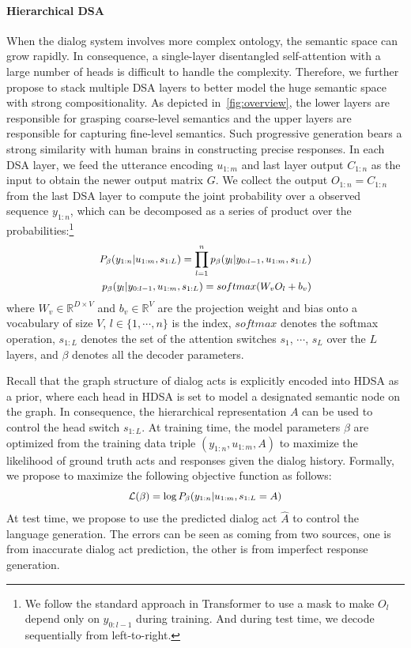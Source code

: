 \documentclass[11pt,a4paper]{article}
\begin{document}
\paragraph{Hierarchical DSA}
When the dialog system involves more complex ontology, the semantic space can grow rapidly. In consequence, a single-layer disentangled self-attention with a large number of heads is difficult to handle the complexity. Therefore, we further propose to stack multiple DSA layers to better model the huge semantic space with strong compositionality. As depicted in~\autoref{fig:overview}, the lower layers are responsible for grasping coarse-level semantics and the upper layers are responsible for capturing fine-level semantics. Such progressive generation bears a strong similarity with human brains in constructing precise responses. In each DSA layer, we feed the utterance encoding $u_{1:m}$ and last layer output $C_{1:n}$ as the input to obtain the newer output matrix $G$. We collect the output $O_{1:n}=C_{1:n}$ from the last DSA layer to compute the joint probability over a observed sequence $y_{1:n}$, which can be decomposed as a series of product over the probabilities:\footnote{We follow the standard approach in Transformer to use a mask to make $O_l$ depend only on $y_{0:l-1}$ during training. And during test time, we decode sequentially from left-to-right.}
\begin{gather*}
\small
\begin{split}
    P_{\beta}(y_{1:n}|u_{1:m}, s_{1:L}) = \prod_{l=1}^n p_{\beta}(y_l|y_{0:l-1}, u_{1:m}, s_{1:L}) \\
    p_{\beta}(y_l|y_{0:l-1}, u_{1:m}, s_{1:L}) = softmax(W_v O_l + b_v)
\end{split}
\end{gather*}
where $W_v \in \mathbb{R}^{D \times V}$ and $b_v \in \mathbb{R}^V$ are the projection weight and bias onto a vocabulary of size $V$, $l \in \{1, \cdots, n\}$ is the index, $softmax$ denotes the softmax operation, $s_{1:L}$ denotes the set of the attention switches $s_1$, $\cdots$, $s_L$ over the $L$ layers, and $\beta$ denotes all the decoder parameters. 

Recall that the graph structure of dialog acts is explicitly encoded into HDSA as a prior, where each head in HDSA is set to model a designated semantic node on the graph. In consequence, the hierarchical representation $A$ can be used to control the head switch $s_{1:L}$. At training time, the model parameters $\beta$ are optimized from the training data triple $(y_{1:n}, u_{1:m}, A)$ to maximize the likelihood of ground truth acts and responses given the dialog history. Formally, we propose to maximize the following objective function as follows:
\begin{align*}
\small
\begin{split}
    \mathcal{L}(\beta) = \log P_{\beta}(y_{1:n}|u_{1:m}, s_{1:L} = A)
\end{split}
\end{align*}
At test time, we propose to use the predicted dialog act $\hat{A}$ to control the language generation. The errors can be seen as coming from two sources, one is from inaccurate dialog act prediction, the other is from imperfect response generation. 
\end{document}
